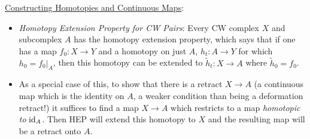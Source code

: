 \documentclass{amsart}
\begin{document}
	\underline{Constructing Homotopies and Continuous Maps}:
	\begin{itemize}
		\item \textit{Homotopy Extension Property for CW Pairs}: Every CW complex $X$ and subcomplex $A$ has the homotopy extension property, which says that if one has a map $f_0:X\to Y$ and a homotopy on just $A$, $h_t:A\to Y$ for which $h_0=f_0|_A$, then this homotopy can be extended to $\tilde{h}_t:X\to A$ where $\tilde{h}_0=f_0$.
		\item As a special case of this, to show that there is a retract $X\to A$ (a continuous map which is the identity on $A$, a weaker condition than being a deformation retract!) it suffices to find a map $X\to A$ which restricts to a map \textit{homotopic to} $\operatorname{id}_A$. Then HEP will extend this homotopy to $X$ and the resulting map will be a retract onto $A$.\\
	\end{itemize}
	
\end{document}
